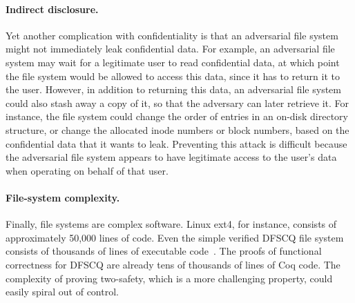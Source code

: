 \paragraph{Indirect disclosure.}
Yet another complication with confidentiality is that an adversarial
file system might not immediately leak confidential data.  For example,
an adversarial file system may wait for a legitimate user to read
confidential data, at which point the file system would be allowed to
access this data, since it has to return it to the user.  However, in
addition to returning this data, an adversarial file system could also
stash away a copy of it, so that the adversary can later retrieve it.
For instance, the file system could change the order of entries in an
on-disk directory structure, or change the allocated inode numbers or
block numbers, based on the confidential data that it wants to leak.
Preventing this attack is difficult because the adversarial file system
appears to have legitimate access to the user's data when operating on
behalf of that user.

\paragraph{File-system complexity.}
Finally, file systems are complex software.  Linux ext4, for
instance, consists of approximately 50,000 lines of code.  Even the simple
verified DFSCQ file system consists of thousands of lines of executable
code~\cite{chen:dfscq}.  The proofs of functional correctness for DFSCQ
are already tens of thousands of lines of Coq code.  The complexity of
proving two-safety, which is a more challenging property, could easily
spiral out of control.
